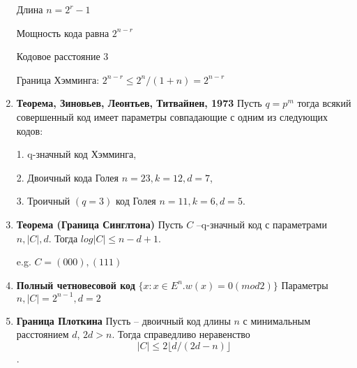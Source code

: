\documentclass[a4paper, 12pt]{report}
\begin{document}
\begin{enumerate}
Длина $n = 2^r - 1$

Мощность кода равна $2^{n-r}$

Кодовое расстояние $3$

Граница Хэмминга: $2^{n-r} \leq 2^n/(1 + n) = 2^{n-r}$

\item \textbf{Теорема, Зиновьев, Леонтьев, Титвайнен, 1973}
Пусть $q = p^m$ тогда всякий совершенный код имеет параметры
совпадающие с одним из следующих кодов:

1. q-значный код Хэмминга,

2. Двоичный кода Голея $n = 23, k = 12, d = 7$,

3. Троичный $(q = 3)$ код Голея $n = 11, k = 6, d = 5$.

\item \textbf{Теорема (Граница Синглтона)}
Пусть $C$ –q-значный код с параметрами $n, |C|, d$. Тогда
$log|C| \leq n - d + 1$.

e.g. $C = {(000),(111)}$


\item \textbf{Полный четновесовой код}
$\{x : x \in E^n. w(x) = 0(mod 2)\}$
Параметры $n, |C| = 2^{n - 1}, d = 2$

\item \textbf{Граница Плоткина}
Пусть – двоичный код длины $n$ с минимальным расстоянием
$d$, $2d > n$. Тогда справедливо неравенство
\[ |C| \leq 2 \lfloor   d/(2d - n) \rfloor \].

\end{enumerate}
\end{document}
